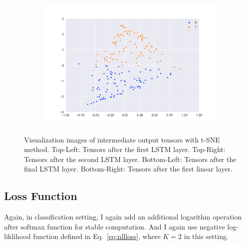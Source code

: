 \begin{figure}[htbp]
\begin{subfigure}
    \end{subfigure}
    \begin{subfigure}
        \centering
        \includegraphics[width=0.45\linewidth]{../images/sst2_feature_map4_tsne.png}
    \end{subfigure}
    \caption{Visualization images of intermediate output tensors with t-SNE method. Top-Left: Tensors after the first LSTM layer. Top-Right: Tensors after the second LSTM layer. Bottom-Left: Tensors after the final LSTM layer. Bottom-Right: Tensors after the first linear layer.}
    \label{fig:sst_tsne}
\end{figure}

\subsection{Loss Function}
Again, in classification setting, I again add an additional logarithm operation after softmax function for stable computation. 
And I again use negative log-liklihood function defined in Eq.~\ref{eq:nllloss}, where $K=2$ in this setting.

